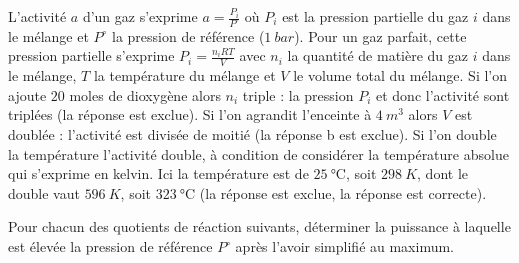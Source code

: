 \reponse{\reponseC{}}

\begin{corrige}
	L'activité $a$ d'un gaz s'exprime $a=\frac{P_i}{P^{\circ}}$ où $P_i$ est la pression partielle du gaz $i$ dans le mélange et $P^{\circ}$ la pression de référence ($\SI{1}{bar}$). Pour un gaz parfait, cette pression partielle s'exprime $P_i=\frac{n_iRT}{V}$ avec $n_i$ la quantité de matière du gaz $i$ dans le mélange, $T$ la température du mélange et $V$ le volume total du mélange. Si l'on ajoute $20$ moles de dioxygène alors $n_i$ triple : la pression $P_i$ et donc l'activité sont triplées (la réponse \reponseA{} est exclue). Si l'on agrandit l'enceinte à $\SI{4}{m^3}$ alors $V$ est doublée : l'activité est divisée de moitié (la réponse b est exclue). Si l'on double la température l'activité double, à condition de considérer la température absolue qui s'exprime en kelvin. Ici la température est de $\SI{25}{\celsius}$, soit $\SI{298}{K}$, dont le double vaut $\SI{596}{K}$, soit $\SI{323}{\celsius}$ (la réponse \reponseD{} est exclue, la réponse \reponseC{} est correcte).
\end{corrige}


\finEntrainement






\hauteurLargeurCadreReponse		{12mm}{4cm}
\typeEntrainement				{} %
\initialisationEntrainement

Pour chacun des quotients de réaction suivants, déterminer la puissance à laquelle est élevée la pression de référence $P^{\circ}$ après l'avoir simplifié au maximum.

